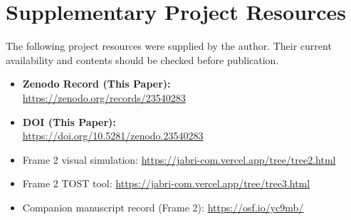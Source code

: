 \documentclass[11pt,a4paper]{article}
\begin{document}
\section{Supplementary Project Resources}

The following project resources were supplied by the author.
Their current availability and contents should be checked
before publication.

\begin{itemize}
\item \textbf{Zenodo Record (This Paper):} \\
\url{https://zenodo.org/records/23540283}

\item \textbf{DOI (This Paper):} \\
\url{https://doi.org/10.5281/zenodo.23540283}

\item Frame 2 visual simulation:
\url{https://jabri-com.vercel.app/tree/tree2.html}

\item Frame 2 TOST tool:
\url{https://jabri-com.vercel.app/tree/tree3.html}

\item Companion manuscript record (Frame 2):
\url{https://osf.io/yc9mb/}
\end{itemize}
\end{document}

